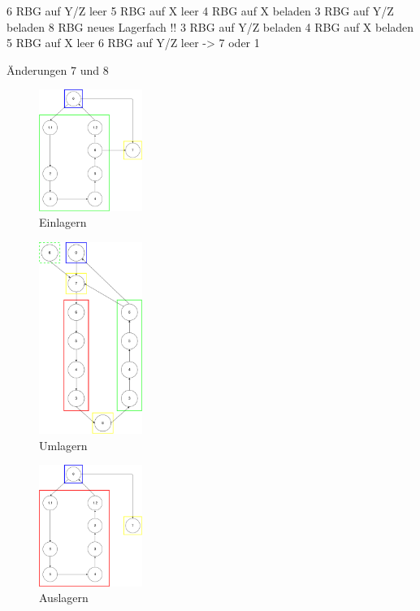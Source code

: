 6 RBG auf Y/Z leer
5 RBG auf X leer
4 RBG auf X beladen
3 RBG auf Y/Z beladen
8 RBG neues Lagerfach !!
3 RBG auf Y/Z beladen
4 RBG auf X beladen
5 RBG auf X leer
6 RBG auf Y/Z leer -> 7 oder 1

Änderungen
7 und 8
%
\begin{figure}[H]
  \begin{center}
    \includegraphics[width=0.3\textwidth]{images/einlagern.png}
    \caption{Einlagern}
    \label{fig:in}
  \end{center}
\end{figure}
%
\begin{figure}[H]
  \begin{center}
    \includegraphics[width=0.3\textwidth]{images/umlagern.png}
    \caption{Umlagern}
    \label{fig:move}
  \end{center}
\end{figure}
%
\begin{figure}[H]
  \begin{center}
    \includegraphics[width=0.3\textwidth]{images/auslagern.png}
    \caption{Auslagern}
    \label{fig:out}
  \end{center}
\end{figure}
%

